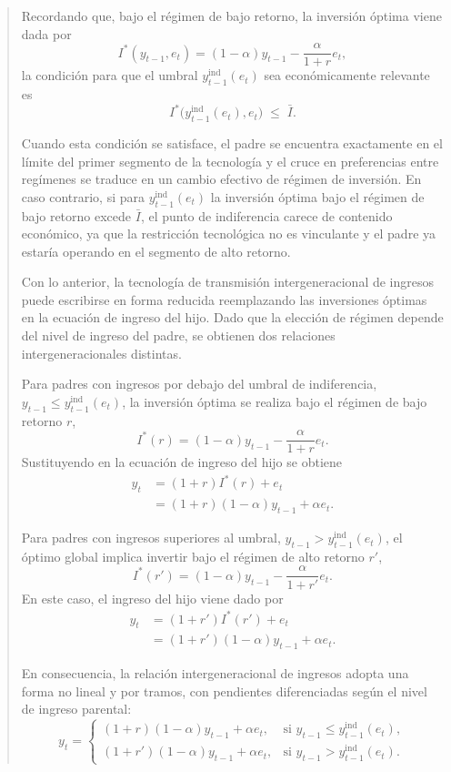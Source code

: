 \documentclass[12pt]{article}
\begin{document}
\begin{abstract}
Recordando que, bajo el régimen de bajo retorno, la inversión óptima viene dada por
\[
I^*(y_{t-1},e_t)
=
(1-\alpha)y_{t-1}-\frac{\alpha}{1+r}e_t,
\]
la condición para que el umbral \(y_{t-1}^{\text{ind}}(e_t)\) sea económicamente relevante es
\[
I^*\big(y_{t-1}^{\text{ind}}(e_t),e_t\big)\;\leq\;\bar I.
\]

Cuando esta condición se satisface, el padre se encuentra exactamente en el límite del primer segmento de la tecnología y el cruce en preferencias entre regímenes se traduce en un cambio efectivo de régimen de inversión. En caso contrario, si para \(y_{t-1}^{\text{ind}}(e_t)\) la inversión óptima bajo el régimen de bajo retorno excede \(\bar I\), el punto de indiferencia carece de contenido económico, ya que la restricción tecnológica no es vinculante y el padre ya estaría operando en el segmento de alto retorno.


Con lo anterior, la tecnología de transmisión intergeneracional de ingresos puede escribirse en forma reducida reemplazando las inversiones óptimas en la ecuación de ingreso del hijo. Dado que la elección de régimen depende del nivel de ingreso del padre, se obtienen dos relaciones intergeneracionales distintas.

Para padres con ingresos por debajo del umbral de indiferencia,
\(y_{t-1} \leq y_{t-1}^{\text{ind}}(e_t)\),
la inversión óptima se realiza bajo el régimen de bajo retorno \(r\),
\[
I^*(r)
=
(1-\alpha)y_{t-1}
-
\frac{\alpha}{1+r}e_t.
\]
Sustituyendo en la ecuación de ingreso del hijo se obtiene
\[
\begin{aligned}
y_t
&=
(1+r)I^*(r)+e_t \\
&=
(1+r)(1-\alpha)y_{t-1}
+
\alpha e_t.
\end{aligned}
\]


Para padres con ingresos superiores al umbral,
\(y_{t-1} > y_{t-1}^{\text{ind}}(e_t)\),
el óptimo global implica invertir bajo el régimen de alto retorno \(r'\),
\[
I^*(r')
=
(1-\alpha)y_{t-1}
-
\frac{\alpha}{1+r'}e_t.
\]
En este caso, el ingreso del hijo viene dado por
\[
\begin{aligned}
y_t
&=
(1+r')I^*(r')+e_t \\
&=
(1+r')(1-\alpha)y_{t-1}
+
\alpha e_t.
\end{aligned}
\]

En consecuencia, la relación intergeneracional de ingresos adopta una forma no lineal y por tramos, con pendientes diferenciadas según el nivel de ingreso parental:
\[
y_t
=
\begin{cases}
(1+r)(1-\alpha)y_{t-1}+\alpha e_t,
& \text{si } y_{t-1}\leq y_{t-1}^{\text{ind}}(e_t), \\[0.4em]
(1+r')(1-\alpha)y_{t-1}+\alpha e_t,
& \text{si } y_{t-1}> y_{t-1}^{\text{ind}}(e_t).
\end{cases}
\]


\end{abstract}
\end{document}

